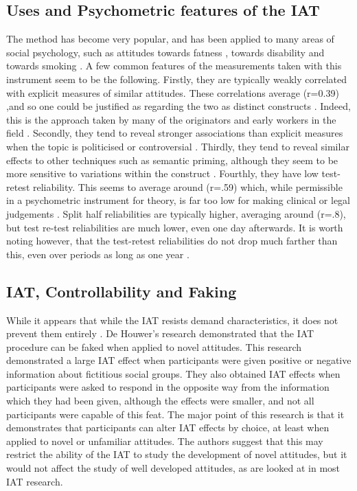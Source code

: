 \subsection{Uses and Psychometric features of the IAT}

The method has become very popular, and has been applied to many areas of social psychology, such as attitudes towards fatness \cite{Ahern2008}, towards disability \cite{Pruett2006} and towards smoking \cite{Kahler2007}. A few common features of the measurements taken with this instrument seem to be the following. Firstly, they are typically weakly correlated with explicit measures of similar attitudes. These correlations average (r=0.39) \cite{Nosek2005},and so one could be justified as regarding the two as distinct constructs \cite{Nosek2007a}. Indeed, this is the approach taken by many of the originators and early workers in the field \cite{Greenwald2000,Nosek2007a}. Secondly, they tend to reveal stronger associations than explicit measures when the topic is politicised or controversial \cite{Greenwald2009}. Thirdly, they tend to reveal similar effects to other techniques such as semantic priming, although they seem to be more sensitive to variations within the construct \cite{Wittenbrink2007a}. Fourthly, they have low test-retest reliability. This seems to average around (r=.59) which, while permissible in a psychometric instrument for theory, is far too low for making clinical or legal judgements \cite{Greenwald2000}. Split half reliabilities are typically higher, averaging around (r=.8), but test re-test reliabilities are much lower, even one day afterwards. It is worth noting however, that the test-retest reliabilities do not drop much farther than this, even over periods as long as one year \cite{Egloff2005}. 

\subsection{IAT, Controllability and Faking}

While it appears that while the IAT resists demand characteristics, it does not prevent them entirely \cite{DeHouwer2007b}. De Houwer's research demonstrated that the IAT procedure can be faked when applied to novel attitudes. This research  demonstrated a large IAT effect when participants were given positive or negative information about fictitious social groups. They also obtained IAT effects when participants were asked to respond in the opposite way from the information which they had been given, although the effects were smaller, and not all participants were capable of this feat.  The major point of this research is that it demonstrates that participants can alter IAT effects by choice, at least when applied to novel or unfamiliar attitudes. The authors suggest that this may restrict the ability of the IAT to study the development of novel attitudes, but it would not affect the study of well developed attitudes, as are looked at in most IAT research.

